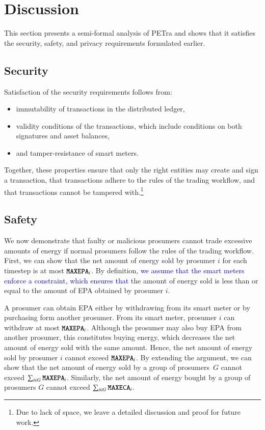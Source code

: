 \section{Discussion}
\label{sec:discussion}

This section presents a semi-formal analysis of PETra and shows that
it satisfies the security, safety, and privacy requirements formulated
earlier.

\subsection{Security}
Satisfaction of the security requirements follows from:
\begin{itemize}[noitemsep,topsep=-\parskip]
\item immutability of transactions in the distributed ledger,
\item validity conditions of the transactions, which include
  conditions on both signatures and asset balances,
\item and tamper-resistance of smart meters.
\end{itemize}
Together, these properties ensure that only the right entities may
create and sign a transaction, that transactions adhere to the rules
of the trading workflow, and that transactions cannot be tampered
with.\footnote{Due to lack of space, we leave a detailed discussion
  and proof for future work.}

\subsection{Safety}
We now demonstrate that faulty or malicious prosumers cannot trade
excessive amounts of energy if normal prosumers follow the rules of
the trading workflow.  First, we can show that the net amount of
energy sold by prosumer $i$ for each timestep is at most
$\texttt{MAXEPA}_i$.  By definition, \textcolor{blue}{we assume that the smart meters enforce a constraint, which ensures that} the amount of energy sold is less
than or equal to the amount of EPA obtained by prosumer $i$.

A prosumer can obtain EPA either by withdrawing from its smart meter
or by purchasing form another prosumer.  From its smart meter,
prosumer $i$ can withdraw at most $\texttt{MAXEPA}_i$.  Although the
prosumer may also buy EPA from another prosumer, this constitutes
buying energy, which decreases the net amount of energy sold with the
same amount.  Hence, the net amount of energy sold by prosumer $i$
cannot exceed $\texttt{MAXEPA}_i$.  By extending the argument, we can
show that the net amount of energy sold by a group of prosumers~$G$
cannot exceed $\sum_{i \in G} \texttt{MAXEPA}_i$.  Similarly, %
 the net amount of energy bought by a group of prosumers $G$
cannot exceed $\sum_{i \in G} \texttt{MAXECA}_i$.

